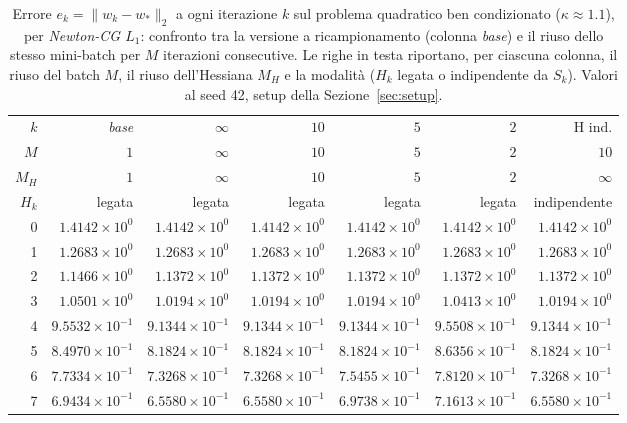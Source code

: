 \begin{table}[H]
\centering
\footnotesize
\renewcommand{\arraystretch}{0.85}
\setlength{\tabcolsep}{2pt}
\caption{Errore $e_k=\|w_k-w_*\|_2$ a ogni iterazione $k$ sul problema quadratico ben condizionato ($\kappa\approx 1.1$), per \emph{Newton-CG $L_1$}: confronto tra la versione a ricampionamento (colonna \emph{base}) e il riuso dello stesso mini-batch per $M$ iterazioni consecutive. Le righe in testa riportano, per ciascuna colonna, il riuso del batch $M$, il riuso dell'Hessiana $M_H$ e la modalità ($H_k$ legata o indipendente da $S_k$). Valori al seed 42, setup della Sezione~\ref{sec:setup}.}
\label{tab:riuso_bencond_l1}
\begin{tabular}{@{}rrrrrrr@{}}
\toprule
$k$ & \emph{base} & $\infty$ & $10$ & $5$ & $2$ & H ind.\\
$M$ & $1$ & $\infty$ & $10$ & $5$ & $2$ & $10$\\
$M_H$ & $1$ & $\infty$ & $10$ & $5$ & $2$ & $\infty$\\
$H_k$ & legata & legata & legata & legata & legata & indipendente\\
\midrule
0 & $1.4142\times10^{0}$ & $1.4142\times10^{0}$ & $1.4142\times10^{0}$ & $1.4142\times10^{0}$ & $1.4142\times10^{0}$ & $1.4142\times10^{0}$\\
1 & $1.2683\times10^{0}$ & $1.2683\times10^{0}$ & $1.2683\times10^{0}$ & $1.2683\times10^{0}$ & $1.2683\times10^{0}$ & $1.2683\times10^{0}$\\
2 & $1.1466\times10^{0}$ & $1.1372\times10^{0}$ & $1.1372\times10^{0}$ & $1.1372\times10^{0}$ & $1.1372\times10^{0}$ & $1.1372\times10^{0}$\\
3 & $1.0501\times10^{0}$ & $1.0194\times10^{0}$ & $1.0194\times10^{0}$ & $1.0194\times10^{0}$ & $1.0413\times10^{0}$ & $1.0194\times10^{0}$\\
4 & $9.5532\times10^{-1}$ & $9.1344\times10^{-1}$ & $9.1344\times10^{-1}$ & $9.1344\times10^{-1}$ & $9.5508\times10^{-1}$ & $9.1344\times10^{-1}$\\
5 & $8.4970\times10^{-1}$ & $8.1824\times10^{-1}$ & $8.1824\times10^{-1}$ & $8.1824\times10^{-1}$ & $8.6356\times10^{-1}$ & $8.1824\times10^{-1}$\\
6 & $7.7334\times10^{-1}$ & $7.3268\times10^{-1}$ & $7.3268\times10^{-1}$ & $7.5455\times10^{-1}$ & $7.8120\times10^{-1}$ & $7.3268\times10^{-1}$\\
7 & $6.9434\times10^{-1}$ & $6.5580\times10^{-1}$ & $6.5580\times10^{-1}$ & $6.9738\times10^{-1}$ & $7.1613\times10^{-1}$ & $6.5580\times10^{-1}$\\

\end{tabular}
\end{table}
